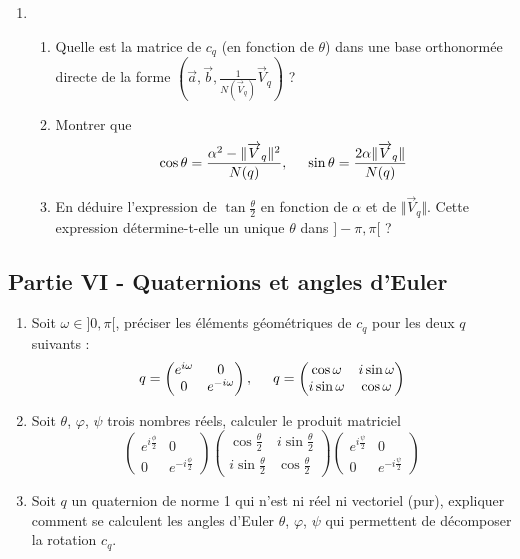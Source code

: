 \begin{enumerate}
\item \begin{enumerate}
\item  Quelle est la matrice de $c_q$ (en fonction de $\theta$) dans une base orthonormée directe de la forme $(\overrightarrow{a}, \overrightarrow{b}, \frac{1}{N(\overrightarrow{V}_q)}\overrightarrow{V}_q)$ ?
\item Montrer que
\begin{displaymath}
\cos \theta =\frac{\alpha ^2 - \Vert \overrightarrow{V}_q \Vert^2}{N(q)}, \hspace{0.5cm}
\sin \theta =\frac{ 2\alpha  \Vert \overrightarrow{V}_q \Vert}{N(q)}  
\end{displaymath}

\item En déduire l'expression de $\tan \frac{\theta}{2}$ en fonction de $\alpha$ et de $\Vert \overrightarrow{V}_q \Vert$. Cette expression détermine-t-elle un unique $\theta$ dans $]-\pi , \pi[$ ?
\end{enumerate}
\end{enumerate} 

\subsection*{Partie VI - Quaternions et angles d'Euler}
\begin{enumerate}
\item Soit $\omega \in ]0,\pi[$, préciser les éléments géométriques de $c_q$ pour les deux $q$ suivants :
\begin{displaymath}
q=\begin{pmatrix}
e^{i\omega} & 0 \\ 
0 & e^{-i\omega}
\end{pmatrix}, \hspace{0.5cm}
q=\begin{pmatrix}
\cos \omega & i \sin \omega \\ 
i \sin \omega & \cos \omega
\end{pmatrix} 
\end{displaymath}

\item Soit $\theta$, $\varphi$, $\psi$ trois nombres réels, calculer le produit matriciel
\[
\begin{pmatrix}
e^{i\frac{\phi}{2}} & 0 \\ 
0 & e^{-i\frac{\phi}{2}}
\end{pmatrix}  
\begin{pmatrix}
\cos \frac{\theta}{2} & i \sin \frac{\theta}{2} \\ 
i \sin \frac{\theta}{2} & \cos \frac{\theta}{2}
\end{pmatrix}
\begin{pmatrix}
e^{i\frac{\psi}{2}} & 0 \\ 
0 & e^{-i\frac{\psi}{2}}
\end{pmatrix}  
\]
\item Soit $q$ un quaternion de norme 1 qui n'est ni réel ni vectoriel (pur), expliquer comment se calculent les angles d'Euler $\theta$, $\varphi$, $\psi$ qui permettent de décomposer la rotation $c_q$.
\end{enumerate} 
